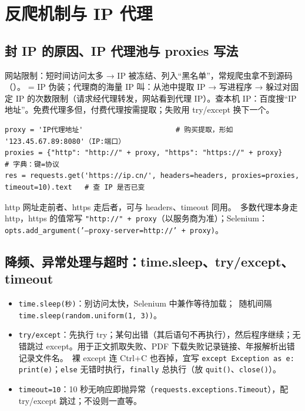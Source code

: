\section{反爬机制与 IP 代理}

\subsection{封 IP 的原因、IP 代理池与 proxies 写法}
网站限制：短时间访问太多 → IP 被冻结、列入“黑名单”，常规爬虫拿不到源码（）。 = IP 伪装；代理商的海量 IP 叫：从池中提取 IP → 写进程序 → 躲过对固定 IP 的次数限制（请求经代理转发，网站看到代理 IP）。查本机 IP：百度搜“IP 地址”。免费代理多但，付费代理按需提取；失败用 try/except 换下一个。
\begin{lstlisting}[style=pyD07]
proxy = 'IP代理地址'                      # 购买提取，形如 '123.45.67.89:8080'（IP:端口）
proxies = {"http": "http://" + proxy, "https": "https://" + proxy}    # 字典：键=协议
res = requests.get('https://ip.cn/', headers=headers, proxies=proxies, timeout=10).text   # 查 IP 是否已变
\end{lstlisting}
http 网址走前者、https 走后者，可与 headers、timeout 同用。\tagext\ 多数代理本身走 http，https 的值常写 \texttt{"http://" + proxy}（以服务商为准）；Selenium：\texttt{opts.add\_argument('--proxy-server=http://' + proxy)}。

\subsection{降频、异常处理与超时：time.sleep、try/except、timeout}
\begin{itemize}
\item \texttt{time.sleep(秒)}：别访问太快，Selenium 中兼作等待加载；\tagext\ 随机间隔 \texttt{time.sleep(random.uniform(1, 3))}。
\item \texttt{try/except}：先执行 try；某句出错（其后语句不再执行），然后程序继续；无错跳过 except。用于正文抓取失败、PDF 下载失败记录链接、年报解析出错记录文件名。\tagext\ 裸 except 连 Ctrl+C 也吞掉，宜写 \texttt{except Exception as e: print(e)}；\texttt{else} 无错时执行，\texttt{finally} 总执行（放 \texttt{quit()}、\texttt{close()}）。
\item \texttt{timeout=10}：10 秒无响应即抛异常（\texttt{requests.exceptions.Timeout}），配 try/except 跳过；不设则一直等。
\end{itemize}

